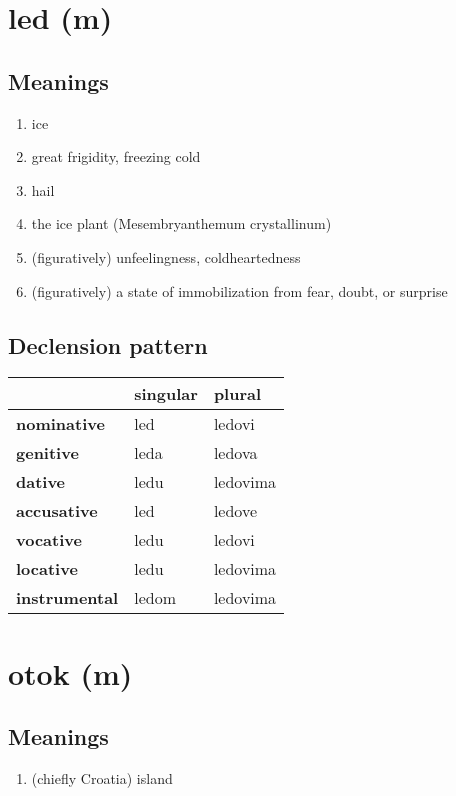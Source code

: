 \filbreak
\section{led (m)}
\subsection*{Meanings}
\begin{enumerate}
\item ice
\item great frigidity, freezing cold
\item hail
\item the ice plant (Mesembryanthemum crystallinum)
\item (figuratively) unfeelingness, coldheartedness
\item (figuratively) a state of immobilization from fear, doubt, or surprise
\end{enumerate}
\subsection*{Declension pattern}
\begin{tabularx}{\linewidth}{Xll}
\toprule
{} & singular &    plural \\
\midrule
\textbf{nominative  } &      led &    ledovi \\
\textbf{genitive    } &     leda &    ledova \\
\textbf{dative      } &     ledu &  ledovima \\
\textbf{accusative  } &      led &    ledove \\
\textbf{vocative    } &     ledu &    ledovi \\
\textbf{locative    } &     ledu &  ledovima \\
\textbf{instrumental} &    ledom &  ledovima \\
\bottomrule
\end{tabularx}

\filbreak
\section{otok (m)}
\subsection*{Meanings}
\begin{enumerate}
\item (chiefly Croatia) island
\end{enumerate}
